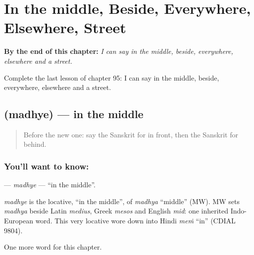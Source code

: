 
\chapter{In the middle, Beside, Everywhere, Elsewhere, Street}
\label{ch:sa-in-the-middle-beside-everywhere-elsewhere-street}

\begin{chapteropening}
\textbf{By the end of this chapter:} \emph{I can say in the middle, beside, everywhere, elsewhere and a street.}

Complete the last lesson of chapter 95: I can say in the middle, beside, everywhere, elsewhere and a street.
\end{chapteropening}

\section[\texorpdfstring{\sk{मध्ये} (madhye)}{मध्ये (madhye)}]{ (madhye) — in the middle}

\label{lesson:SA-C95-madhye}



\begin{quote}
Before the new one: say the Sanskrit for in front, then the Sanskrit for behind.
\end{quote}

\subsection*{You'll want to know: }
\textbf{} — \emph{madhye} — \textquotedblleft{}in the middle\textquotedblright{}.

\begin{cousinweb}
\emph{madhye} is the locative, \textquotedblleft{}in the middle\textquotedblright{}, of \emph{madhya} \textquotedblleft{}middle\textquotedblright{} (MW). MW sets \emph{madhya} beside Latin \emph{medius}, Greek \emph{mesos} and English \emph{mid}: one inherited Indo-European word. This very locative wore down into Hindi \emph{meṁ} \textquotedblleft{}in\textquotedblright{} (CDIAL 9804).
\end{cousinweb}

\begin{grammarlens}[title={What you've built}]
One more word for this chapter.
\end{grammarlens}

